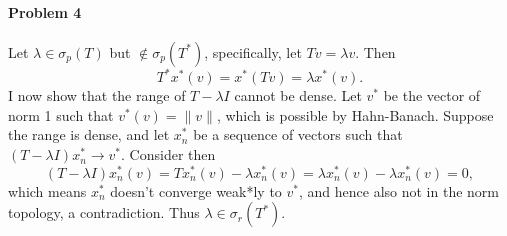 \documentclass[12pt]{article}
\newcommand{\s}{\sigma}
\renewcommand{\l}{\lambda}
\begin{document}
\paragraph{Problem 4}
Let $\l \in \s_p(T)$ but $\notin \s_p(T^*)$, specifically, let $Tv = \l v$. Then
\begin{displaymath}
  T^*x^*(v) = x^*(Tv) = \lambda x^*(v).
\end{displaymath}
I now show that the range of $T-\l I$ cannot be dense. Let $v^*$ be the vector
of norm 1 such that $v^*(v) = \|v\|$, which is possible by Hahn-Banach. Suppose
the range is dense, and let $x_n^*$ be a sequence of vectors such that
$(T-\l I)x_n^*\to v^*$. Consider then
\begin{displaymath}
  (T-\l I)x_n^*(v) = Tx_n^*(v)-\l x_n^*(v) = \l x_n^*(v)-\l x_n^*(v) = 0,
\end{displaymath}
which means $x^*_n$ doesn't converge weak*ly to $v^*$, and hence also not in the
norm topology, a contradiction. Thus $\l \in \s_r(T^*)$.
\end{document}
